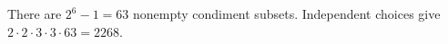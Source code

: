 There are $2^6-1=63$ nonempty condiment subsets. Independent choices give $2\cdot2\cdot3\cdot3\cdot63=\boxed{2268}$.
